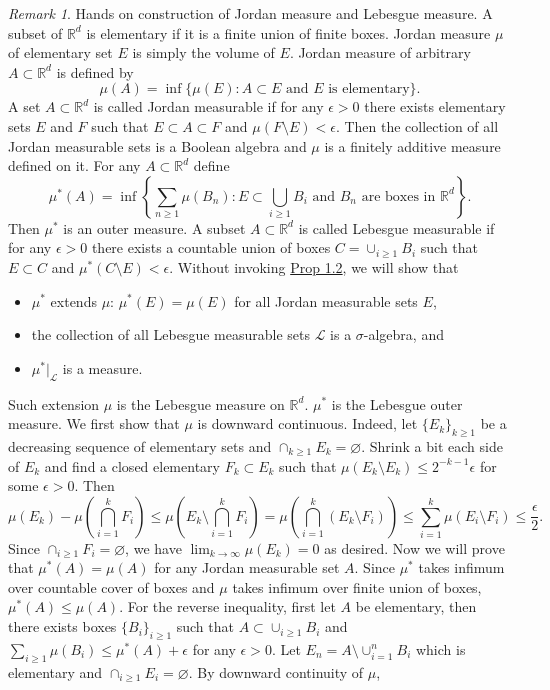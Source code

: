 \documentclass[hidelinks,11pt]{article}
\theoremstyle{definition}
\theoremstyle{dotless}
\theoremstyle{remark}
\newtheorem*{remark}{Remark}
\DeclareMathOperator{\1}{\mathbf{1}}
\begin{document}
\begin{remark}
Hands on construction of Jordan measure and Lebesgue measure.\medbreak
A subset of $\mathbb{R}^d$ is elementary if it is a finite union of finite boxes. Jordan measure $\mu$ of elementary set $E$ is simply the volume of $E$. Jordan measure of arbitrary $A\subset\mathbb{R}^d$ is defined by
\[\mu(A)=\inf\{\mu(E):A\subset E\textrm{ and }E\textrm{ is elementary}\}.\]
A set $A\subset\mathbb{R}^d$ is called Jordan measurable if for any $\epsilon>0$ there exists elementary sets $E$ and $F$ such that $E\subset A\subset F$ and $\mu(F\setminus E)<\epsilon$. Then the collection of all Jordan measurable sets is a Boolean algebra and $\mu$ is a finitely additive measure defined on it.\medbreak
For any $A\subset\mathbb{R}^d$ define
\[\mu^\ast(A)=\inf\left\{\sum_{n\geq1}\mu(B_n):E\subset\bigcup_{i\geq1}B_i\textrm{ and }B_n\textrm{ are boxes in }\mathbb{R}^d\right\}.\]
Then $\mu^\ast$ is an outer measure. A subset $A\subset\mathbb{R}^d$ is called Lebesgue measurable if for any $\epsilon>0$ there exists a countable union of boxes $C=\cup_{i\geq1}B_i$ such that $E\subset C$ and $\mu^\ast(C\setminus E)<\epsilon$. Without invoking \hyperref[Prop 1.1]{Prop 1.2}, we will show that\begin{itemize}
    \item $\mu^*$ extends $\mu$: $\mu^\ast(E)=\mu(E)$ for all Jordan measurable sets $E$,
    \item the collection of all Lebesgue measurable sets $\mathcal{L}$ is a $\sigma$-algebra, and
    \item $\mu^\ast|_\mathcal{L}$ is a measure.
\end{itemize}
Such extension $\mu$ is the Lebesgue measure on $\mathbb{R}^d$. $\mu^\ast$ is the Lebesgue outer measure.\medbreak
We first show that $\mu$ is downward continuous. Indeed, let $\{E_k\}_{k\geq1}$ be a decreasing sequence of elementary sets and $\cap_{k\geq1}E_k=\varnothing$. Shrink a bit each side of $E_k$ and find a closed elementary $F_k\subset E_k$ such that $\mu(E_k\setminus E_k)\leq2^{-k-1}\epsilon$ for some $\epsilon>0$. Then
\[\mu(E_k)-\mu(\bigcap_{i=1}^kF_i)\leq\mu(E_k\setminus\bigcap_{i=1}^kF_i)=\mu(\bigcap_{i=1}^k(E_k\setminus F_i))\leq\sum_{i=1}^k\mu(E_i\setminus F_i)\leq\frac{\epsilon}{2}.\]
Since $\cap_{i\geq1}F_i=\varnothing$, we have $\lim_{k\to\infty}\mu(E_k)=0$ as desired.\medbreak
Now we will prove that $\mu^\ast(A)=\mu(A)$ for any Jordan measurable set $A$. Since $\mu^*$ takes infimum over countable cover of boxes and $\mu$ takes infimum over finite union of boxes, $\mu^\ast(A)\leq\mu(A)$. For the reverse inequality, first let $A$ be elementary, then there exists boxes $\{B_i\}_{i\geq1}$ such that $A\subset\cup_{i\geq1}B_i$ and $\sum_{i\geq1}\mu(B_i)\leq\mu^\ast(A)+\epsilon$ for any $\epsilon>0$. Let $E_n=A\setminus\cup_{i=1}^nB_i$ which is elementary and $\cap_{i\geq1}E_i=\varnothing$. By downward continuity of $\mu$,

\end{remark}
\end{document}
